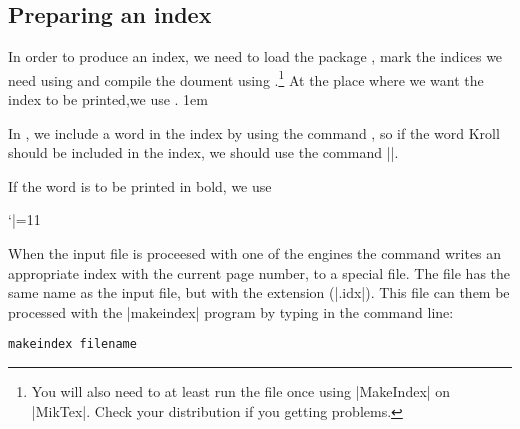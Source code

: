 \pagestyle{headings}


\setlength{\columnsep}{2em}

\begin{multicols}{2}

\section{Preparing an index}


In order to produce an index, we need to load the
package , mark the indices we need using   and compile the doument using  .\footnote{You will also need to at least run the file once using |MakeIndex| on |MikTex|. Check your distribution if you getting problems.}
At the place where we want the index to be printed,we use .
\parindent1em

In \latex, we include a word
in the index by using the command \cmd{\index}, so if the word Kroll should be included in
the index, we should use the command ||.

If the word is to be printed in bold, we use

\bgroup
 \catcode`|=11
\gdef\idxmain#1{%
   \def\idxmainentryi##1##2##3;{%
      \index{Kroll=\textbf{#1}|textbf}
    }
   \idxmainentryi#1;    
}  
\egroup

\idxmain{Kroll}




When the input file is proceesed with one of the \latex engines the  command
writes an appropriate index with the current page number, to a special file. The file has the same
name as the \latex input file, but with the extension (|.idx|). This file can them be processed with the |makeindex| program by typing in the command line:

\begin{verbatim}
makeindex filename
\end{verbatim}


\end{multicols}
